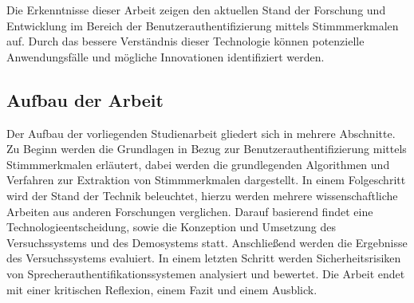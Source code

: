 Die Erkenntnisse dieser Arbeit zeigen den aktuellen Stand der Forschung und Entwicklung im Bereich der Benutzerauthentifizierung mittels Stimmmerkmalen auf.
Durch das bessere Verständnis dieser Technologie können potenzielle Anwendungsfälle und mögliche Innovationen identifiziert werden.

\subsection{Aufbau der Arbeit}

\textauthor{\vLB}{}{}

Der Aufbau der vorliegenden Studienarbeit gliedert sich in mehrere Abschnitte.
Zu Beginn werden die Grundlagen in Bezug zur Benutzerauthentifizierung mittels Stimmmerkmalen erläutert, dabei werden die grundlegenden Algorithmen und Verfahren zur Extraktion von Stimmmerkmalen dargestellt.
In einem Folgeschritt wird der Stand der Technik beleuchtet, hierzu werden mehrere wissenschaftliche Arbeiten aus anderen Forschungen verglichen.
Darauf basierend findet eine Technologieentscheidung, sowie die Konzeption und Umsetzung des Versuchssystems und des Demosystems statt.
Anschließend werden die Ergebnisse des Versuchssystems evaluiert.
In einem letzten Schritt werden Sicherheitsrisiken von Sprecherauthentifikationssystemen analysiert und bewertet.
Die Arbeit endet mit einer kritischen Reflexion, einem Fazit und einem Ausblick.
